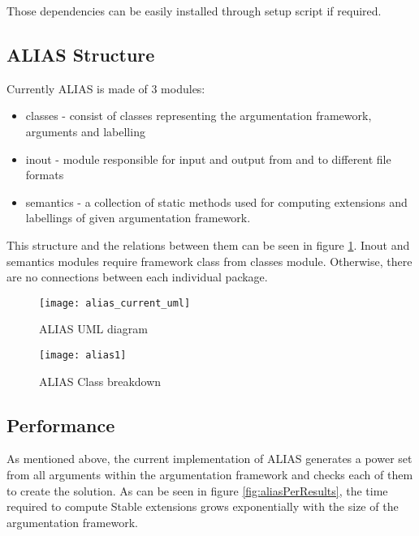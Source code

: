 Those dependencies can be easily installed through setup script if required. 

\subsection{ALIAS Structure}
Currently ALIAS is made of 3 modules: 

\begin{itemize}
	\item classes - consist of classes representing the argumentation framework, arguments and labelling
	\item inout - module responsible for input and output from and to different file formats
	\item semantics - a collection of static methods used for computing extensions and labellings of given argumentation framework.
\end{itemize}

This structure and the relations between them can be seen in figure \ref{fig:aliasUml1}. Inout and semantics modules require framework class from classes module. Otherwise, there are no connections between each individual package.

\begin{figure}[h]
	\texttt{[image: alias\_current\_uml]}
	\caption{ALIAS UML diagram}
	\label{fig:aliasUml1}
\end{figure}



\begin{landscape}
	\begin{figure}
		\texttt{[image: alias1]}
		\caption{ALIAS Class breakdown}
		\label{fig:aliasClassBreakdown}
	\end{figure}
\end{landscape}

\subsection{Performance}
As mentioned above, the current implementation of ALIAS generates a power set from all arguments within the argumentation framework and checks each of them to create the solution. As can be seen in figure \ref{fig:aliasPerResults}, the time required to compute Stable extensions grows exponentially with the size of the argumentation framework. 

